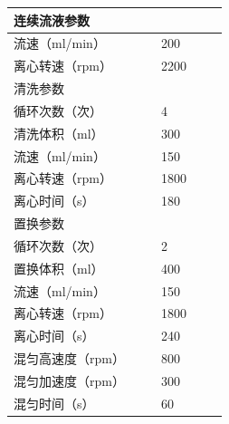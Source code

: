 \documentclass[UTF8,10pt,a4paper,fontset=fandol]{ctexart}
\newcommand{\fieldvalue}[1]{#1}
\begin{document}
\begin{tabular}{|p{0.33\linewidth}|p{0.14\linewidth}|}
\hline
\multicolumn{2}{|l|}{连续流液参数} \\
\hline
流速（ml/min） &
\fieldvalue{200}
\\
\hline
离心转速（rpm） &
\fieldvalue{2200}
\\
\hline
\multicolumn{2}{|l|}{清洗参数} \\
\hline
循环次数（次） &
\fieldvalue{4}
\\
\hline
清洗体积（ml） &
\fieldvalue{300}
\\
\hline
流速（ml/min） &
\fieldvalue{150}
\\
\hline
离心转速（rpm） &
\fieldvalue{1800}
\\
\hline
离心时间（s） &
\fieldvalue{180}
\\
\hline
\multicolumn{2}{|l|}{置换参数} \\
\hline
循环次数（次） &
\fieldvalue{2}
\\
\hline
置换体积（ml） &
\fieldvalue{400}
\\
\hline
流速（ml/min） &
\fieldvalue{150}
\\
\hline
离心转速（rpm） &
\fieldvalue{1800}
\\
\hline
离心时间（s） &
\fieldvalue{240}
\\
\hline
混匀高速度（rpm） &
\fieldvalue{800}
\\
\hline
混匀加速度（rpm） &
\fieldvalue{300}
\\
\hline
混匀时间（s） &
\fieldvalue{60}
\\
\hline
\end{tabular}
\end{document}
